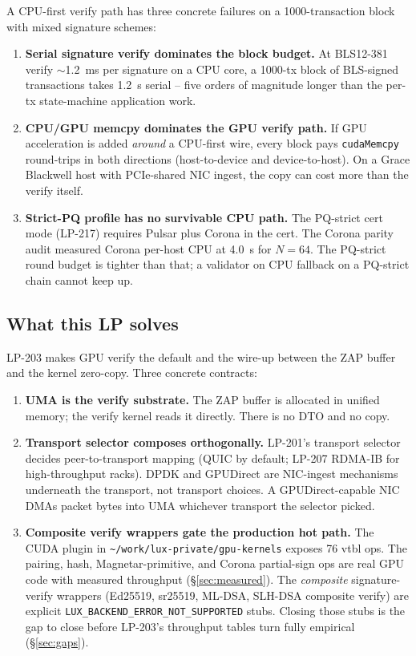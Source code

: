 A CPU-first verify path has three concrete failures on a
1000-transaction block with mixed signature schemes:

\begin{enumerate}[leftmargin=2em,nosep]
\item \textbf{Serial signature verify dominates the block budget.}
  At BLS12-381 verify $\sim$\SI{1.2}{\milli\second} per signature
  on a CPU core, a 1000-tx block of BLS-signed transactions takes
  \SI{1.2}{\second} serial -- five orders of magnitude longer
  than the per-tx state-machine application work.
\item \textbf{CPU/GPU memcpy dominates the GPU verify path.} If
  GPU acceleration is added \emph{around} a CPU-first wire, every
  block pays \texttt{cudaMemcpy} round-trips in both directions
  (host-to-device and device-to-host). On a Grace Blackwell host
  with PCIe-shared NIC ingest, the copy can cost more than the
  verify itself.
\item \textbf{Strict-PQ profile has no survivable CPU path.} The
  PQ-strict cert mode (LP-217) requires Pulsar plus Corona in
  the cert. The Corona parity audit \cite{paritytest} measured
  Corona per-host CPU at \SI{4.0}{\second} for $N{=}64$. The
  PQ-strict round budget is tighter than that; a validator on
  CPU fallback on a PQ-strict chain cannot keep up.
\end{enumerate}

\subsection{What this LP solves}

LP-203 makes GPU verify the default and the wire-up between the
ZAP buffer and the kernel zero-copy. Three concrete contracts:

\begin{enumerate}[leftmargin=2em,nosep]
\item \textbf{UMA is the verify substrate.} The ZAP buffer is
  allocated in unified memory; the verify kernel reads it
  directly. There is no DTO and no copy.
\item \textbf{Transport selector composes orthogonally.} LP-201's
  transport selector decides peer-to-transport mapping (QUIC by
  default; LP-207 RDMA-IB for high-throughput racks). DPDK and
  GPUDirect are NIC-ingest mechanisms underneath the transport,
  not transport choices. A GPUDirect-capable NIC DMAs packet
  bytes into UMA whichever transport the selector picked.
\item \textbf{Composite verify wrappers gate the production
  hot path.} The CUDA plugin in
  \texttt{\textasciitilde/work/lux-private/gpu-kernels} exposes
  76 vtbl ops. The pairing, hash, Magnetar-primitive, and Corona
  partial-sign ops are real GPU code with measured throughput
  (\S\ref{sec:measured}). The \emph{composite} signature-verify
  wrappers (Ed25519, sr25519, ML-DSA, SLH-DSA composite verify)
  are explicit \texttt{LUX\_BACKEND\_ERROR\_NOT\_SUPPORTED}
  stubs. Closing those stubs is the gap to close before LP-203's
  throughput tables turn fully empirical (\S\ref{sec:gaps}).
\end{enumerate}

